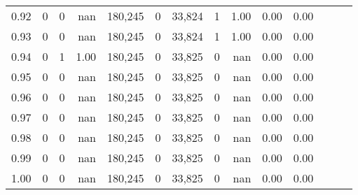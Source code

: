 \begin{tabular}{rrrrrrrrrrrrrr}
0.92 &      0 &      0 &   nan &  180,245 &        0 &  33,824 &       1 &  1.00 &  0.00 &      0.00 \\
0.93 &      0 &      0 &   nan &  180,245 &        0 &  33,824 &       1 &  1.00 &  0.00 &      0.00 \\
0.94 &      0 &      1 &  1.00 &  180,245 &        0 &  33,825 &       0 &   nan &  0.00 &      0.00 \\
0.95 &      0 &      0 &   nan &  180,245 &        0 &  33,825 &       0 &   nan &  0.00 &      0.00 \\
0.96 &      0 &      0 &   nan &  180,245 &        0 &  33,825 &       0 &   nan &  0.00 &      0.00 \\
0.97 &      0 &      0 &   nan &  180,245 &        0 &  33,825 &       0 &   nan &  0.00 &      0.00 \\
0.98 &      0 &      0 &   nan &  180,245 &        0 &  33,825 &       0 &   nan &  0.00 &      0.00 \\
0.99 &      0 &      0 &   nan &  180,245 &        0 &  33,825 &       0 &   nan &  0.00 &      0.00 \\
1.00 &      0 &      0 &   nan &  180,245 &        0 &  33,825 &       0 &   nan &  0.00 &      0.00 \\
\bottomrule
\end{tabular}
